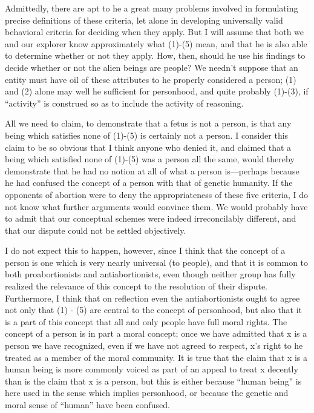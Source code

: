 Admittedly, there are apt to he a great many problems
involved in formulating precise definitions of these
criteria, let alone in developing universally valid
behavioral criteria for deciding when they apply. But I
will assume that both we and our explorer know
approximately what (1)-(5) mean, and that he is also able
to determine whether or not they apply. How, then, should
he use his findings to decide whether or not the alien
beings are people? We needn’t suppose that an entity
must have oil of these attributes to he properly considered
a person; (1) and (2) alone may well he sufficient for
personhood, and quite probably (1)-(3), if ``activity” is
construed so as to include the activity of reasoning.

All we need to claim, to demonstrate that a fetus is not a
person, is that any being which satisfies none of (1)-(5) is
certainly not a person. I consider this claim to be so
obvious that I think anyone who denied it, and claimed
that a being which satisfied none of (1)-(5) was a person
all the same, would thereby demonstrate that he had no
notion at all of what a person is—perhaps because he had
confused the concept of a person with that of genetic
humanity. If the opponents of abortion were to deny the
appropriateness of these five criteria, I do not know what
further arguments would convince them. We would
probably have to admit that our conceptual schemes were
indeed irreconcilably different, and that our dispute could
not be settled objectively.

I do not expect this to happen, however, since I think that
the concept of a person is one which is very nearly
universal (to people), and that it is common to both
proabortionists and antiabortionists, even though neither
group has fully realized the relevance of this concept to
the resolution of their dispute. Furthermore, I think that
on reflection even the antiabortionists ought to agree not
only that (1) - (5) are central to the concept of
personhood, but also that it is a part of this concept that
all and only people have full moral rights. The concept of
a person is in part a moral concept; once we have
admitted that x is a person we have recognized, even if we
have not agreed to respect, x’s right to he treated as a
member of the moral community. It is true that the claim
that x is a human being is more commonly voiced as part
of an appeal to treat x decently than is the claim that x is a
person, but this is either because ``human being” is here
used in the sense which implies personhood, or because
the genetic and moral sense of ``human” have been
confused.

